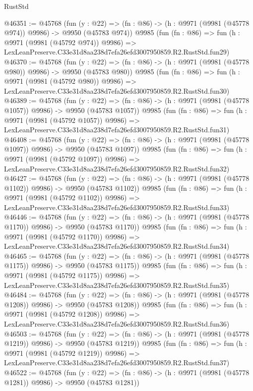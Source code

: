 \begin{lexlean}{RustStd}
\begin{coremodule}
@46351 := @45768
    (fun (y : @22) => (fn : @86) -> (h : @9971 (@9981 (@45778 @974)) @9986) -> @9950 (@45783 @974))
    @9985
    (fun (fn : @86) =>
    fun (h : @9971 (@9981 (@45792 @974)) @9986) =>
    LexLeanPreserve.C33e31d8aa238d7efa26efd3007950859.R2.RustStd.fun29)
@46370 := @45768
    (fun (y : @22) => (fn : @86) -> (h : @9971 (@9981 (@45778 @980)) @9986) -> @9950 (@45783 @980))
    @9985
    (fun (fn : @86) =>
    fun (h : @9971 (@9981 (@45792 @980)) @9986) =>
    LexLeanPreserve.C33e31d8aa238d7efa26efd3007950859.R2.RustStd.fun30)
@46389 := @45768
    (fun (y : @22) =>
    (fn : @86) -> (h : @9971 (@9981 (@45778 @1057)) @9986) -> @9950 (@45783 @1057))
    @9985
    (fun (fn : @86) =>
    fun (h : @9971 (@9981 (@45792 @1057)) @9986) =>
    LexLeanPreserve.C33e31d8aa238d7efa26efd3007950859.R2.RustStd.fun31)
@46408 := @45768
    (fun (y : @22) =>
    (fn : @86) -> (h : @9971 (@9981 (@45778 @1097)) @9986) -> @9950 (@45783 @1097))
    @9985
    (fun (fn : @86) =>
    fun (h : @9971 (@9981 (@45792 @1097)) @9986) =>
    LexLeanPreserve.C33e31d8aa238d7efa26efd3007950859.R2.RustStd.fun32)
@46427 := @45768
    (fun (y : @22) =>
    (fn : @86) -> (h : @9971 (@9981 (@45778 @1102)) @9986) -> @9950 (@45783 @1102))
    @9985
    (fun (fn : @86) =>
    fun (h : @9971 (@9981 (@45792 @1102)) @9986) =>
    LexLeanPreserve.C33e31d8aa238d7efa26efd3007950859.R2.RustStd.fun33)
@46446 := @45768
    (fun (y : @22) =>
    (fn : @86) -> (h : @9971 (@9981 (@45778 @1170)) @9986) -> @9950 (@45783 @1170))
    @9985
    (fun (fn : @86) =>
    fun (h : @9971 (@9981 (@45792 @1170)) @9986) =>
    LexLeanPreserve.C33e31d8aa238d7efa26efd3007950859.R2.RustStd.fun34)
@46465 := @45768
    (fun (y : @22) =>
    (fn : @86) -> (h : @9971 (@9981 (@45778 @1175)) @9986) -> @9950 (@45783 @1175))
    @9985
    (fun (fn : @86) =>
    fun (h : @9971 (@9981 (@45792 @1175)) @9986) =>
    LexLeanPreserve.C33e31d8aa238d7efa26efd3007950859.R2.RustStd.fun35)
@46484 := @45768
    (fun (y : @22) =>
    (fn : @86) -> (h : @9971 (@9981 (@45778 @1208)) @9986) -> @9950 (@45783 @1208))
    @9985
    (fun (fn : @86) =>
    fun (h : @9971 (@9981 (@45792 @1208)) @9986) =>
    LexLeanPreserve.C33e31d8aa238d7efa26efd3007950859.R2.RustStd.fun36)
@46503 := @45768
    (fun (y : @22) =>
    (fn : @86) -> (h : @9971 (@9981 (@45778 @1219)) @9986) -> @9950 (@45783 @1219))
    @9985
    (fun (fn : @86) =>
    fun (h : @9971 (@9981 (@45792 @1219)) @9986) =>
    LexLeanPreserve.C33e31d8aa238d7efa26efd3007950859.R2.RustStd.fun37)
@46522 := @45768
    (fun (y : @22) =>
    (fn : @86) -> (h : @9971 (@9981 (@45778 @1281)) @9986) -> @9950 (@45783 @1281))

\end{coremodule}
\end{lexlean}
